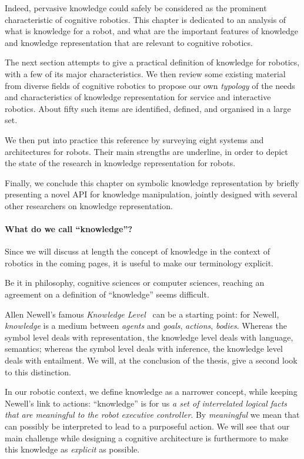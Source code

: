 Indeed, pervasive knowledge could safely be considered as the prominent
characteristic of cognitive robotics. This chapter is dedicated to an analysis
of what is knowledge for a robot, and what are the important features of
knowledge and knowledge representation that are relevant to cognitive robotics.

The next section attempts to give a practical definition of knowledge for
robotics, with a few of its major characteristics. We then review some existing
material from diverse fields of cognitive robotics to propose our own
\emph{typology} of the needs and characteristics of knowledge representation
for service and interactive robotics. About fifty such items are identified,
defined, and organised in a large set.

We then put into practice this reference by surveying eight systems and
architectures for robots. Their main strengths are underline, in order to
depict the state of the research in knowledge representation for robots.

Finally, we conclude this chapter on symbolic knowledge representation by
briefly presenting a novel API for knowledge manipulation, jointly designed
with several other researchers on knowledge representation.

\paragraph{What do we call ``knowledge''?}
\label{sect|on-knowledge}

Since we will discuss at length the concept of knowledge in the context of
robotics in the coming pages, it is useful to make our terminology explicit.

Be it in philosophy, cognitive sciences or computer sciences, reaching an
agreement on a definition of ``knowledge'' seems difficult.

Allen Newell's famous \emph{Knowledge Level}~\cite{Newell1981} can be a
starting point: for Newell, \emph{knowledge} is a medium between \emph{agents}
and \emph{goals}, \emph{actions}, \emph{bodies}. Whereas the symbol level deals
with representation, the knowledge level deals with language, semantics;
whereas the symbol level deals with inference, the knowledge level deals with
entailment. We will, at the conclusion of the thesis, give a second look to
this distinction.

In our robotic context, we define knowledge as a narrower concept, while
keeping Newell's link to actions: ``knowledge'' is for us  \emph{a set of
interrelated logical facts that are meaningful to the robot executive
controller}. By \emph{meaningful} we mean that can possibly be interpreted to
lead to a purposeful action. We will see that our main challenge while
designing a cognitive architecture is furthermore to make this knowledge as
\emph{explicit} as possible.

